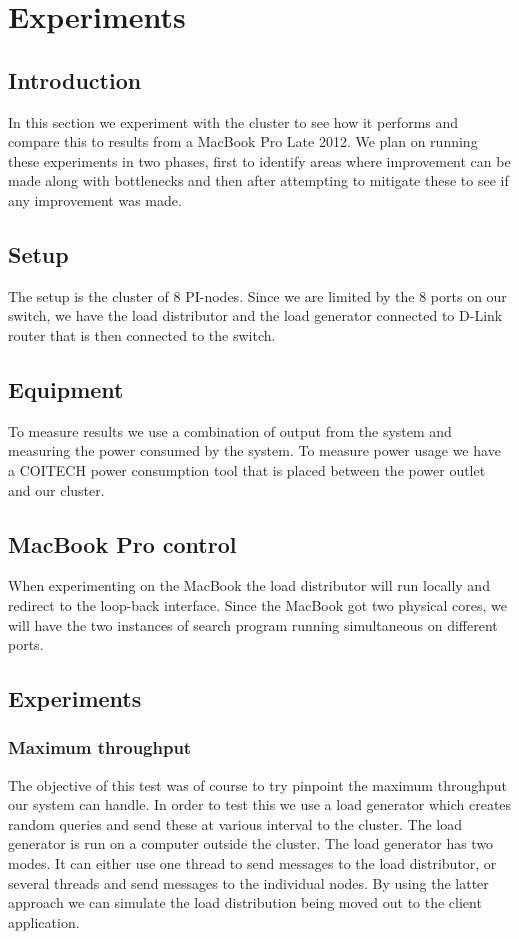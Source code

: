 
\clearpage
\section{Experiments}

\subsection{Introduction}
In this section we experiment with the cluster to see how it performs and compare this to results from a MacBook Pro Late 2012. We plan on running these experiments in two phases, first to identify areas where improvement can be made along with bottlenecks and then after attempting to mitigate these to see if any improvement was made.

\subsection{Setup}
The setup is the cluster of 8 PI-nodes. Since we are limited by the 8 ports on our switch, we have the load distributor and the load generator connected to D-Link router that is then connected to the switch. 

\subsection{Equipment}
To measure results we use a combination of output from the system and measuring the power consumed by the system. To measure power usage we have a COITECH power consumption tool that is placed between the power outlet and our cluster.

\subsection{MacBook Pro control}
When experimenting on the MacBook the load distributor will run locally and redirect to the loop-back interface. Since the MacBook got two physical cores, we will have the two instances of search program running simultaneous on different ports.  

\subsection{Experiments}

\subsubsection{Maximum throughput} 
The objective of this test was of course to try pinpoint the maximum throughput our system can handle. In order to test this we use a load generator which creates random queries and send these at various interval to the cluster. The load generator is run on a computer outside the cluster. The load generator has two modes. It can either use one thread to send messages to the load distributor, or several threads and send messages to the individual nodes. By using the latter approach we can simulate the load distribution being moved out to the client application. 


